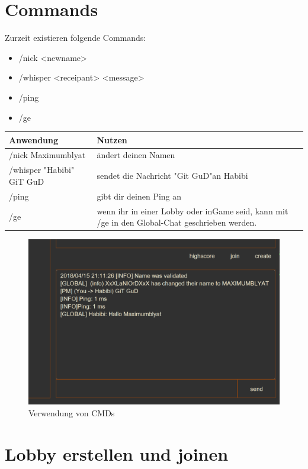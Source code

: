 \documentclass{scrartcl}
\begin{document}
\pagebreak
\section{Commands}
Zurzeit existieren folgende Commands:
\begin{itemize}
    \item /nick <newname>
    \item /whisper <\grqq receipant\grqq> <message>
    \item /ping
    \item /ge
\end{itemize}
  
\begin{center}
    \begin{tabular}{| p{6cm} | p{6cm} |}
        \hline
        \textbf{Anwendung} & \textbf{Nutzen} \\ \hline
        /nick Maximumblyat & ändert deinen Namen   \\ \hline
        /whisper "Habibi" \space GiT GuD & sendet die Nachricht "Git GuD"\space an Habibi  \\ \hline
        /ping & gibt dir deinen Ping an  \\ \hline
        /ge & wenn ihr in einer Lobby oder inGame seid, kann mit /ge in den Global-Chat geschrieben werden. \\ \hline
    \end{tabular}
\end{center}

\begin{figure}[H]
	\includegraphics[width=\linewidth]{CMDS.png}
	\caption{Verwendung von CMDs}
	\label{fig:map1}
\end{figure}
\pagebreak
\section{Lobby erstellen und joinen}
\end{document}
